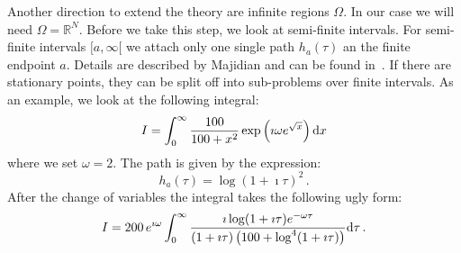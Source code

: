 \documentclass[a4paper,10pt]{article}
\begin{document}
Another direction to extend the theory are infinite regions $\Omega$. In our case we will
need $\Omega = \mathbb{R}^N$. Before we take this step, we look at semi-finite intervals.
For semi-finite intervals $[a, \infty [$ we attach only one single path $h_a(\tau)$ an the
finite endpoint $a$. Details are described by Majidian and can be found in~\cite{H_nsd_sii}. If there
are stationary points, they can be split off into sub-problems over finite intervals.
As an example, we look at the following integral:
\begin{equation}
  I = \int_0^\infty \frac{100}{100 + x^2} \exp\left(\imath \omega e^{\sqrt{x}}\right) \mathrm{d}x
\end{equation}
where we set $\omega = 2$. The path is given by the expression:
\begin{equation}
  h_a(\tau) = {\log(1 + \imath\tau)}^2 \,.
\end{equation}
After the change of variables the integral takes the following ugly form:
\begin{equation}
  I = 200 \, e^{\imath \omega}
      \int_0^{\infty}
        \frac{\imath \log(1+\imath\tau) e^{-\omega\tau}}
             {(1 + \imath\tau)\left(100+\log^4(1+\imath\tau)\right)}
      \mathrm{d}\tau \,.
\end{equation}
\end{document}
